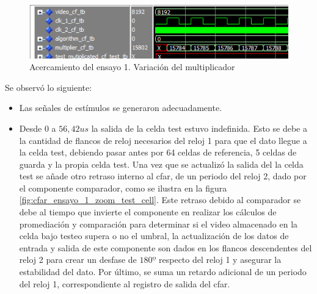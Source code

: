 \begin{figure}
\centering
\includegraphics[scale=1]{./Figures/cfar_ensayo_1_zoom_multiplicador.png}
\caption{Acercamiento del ensayo 1. Variación del multiplicador}
\label{fig:cfar_ensayo_1_zoom_multiplicador}
\end{figure}



Se observó lo siguiente:

\begin{itemize}
\item
Las señales de estímulos se generaron adecuadamente.

\item
Desde $0$ a $56,42 us$ la salida de la celda test estuvo indefinida. Esto se debe a la cantidad de flancos de reloj necesarios del reloj 1 para que el dato llegue a la celda  test, debiendo pasar antes por 64 celdas de referencia, 5 celdas de guarda y la propia celda test. Una vez que se actualizó la salida del la celda test se añade otro retraso interno al cfar, de un periodo del reloj 2, dado por el componente comparador, como se ilustra en la figura \ref{fig:cfar_ensayo_1_zoom_test_cell}. Este retraso debido al comparador se debe al tiempo que invierte el componente en realizar los cálculos de promediación y comparación para determinar si el video almacenado en la celda bajo testeo supera o no el umbral, la actualización de los datos de entrada y salida de este componente son dados en los flancos descendentes del reloj 2 para crear un desfase de $180º$ respecto del reloj 1 y asegurar la estabilidad del dato. Por último, se suma un retardo adicional de un periodo del reloj 1, correspondiente al registro de salida del cfar.


\end{itemize}
